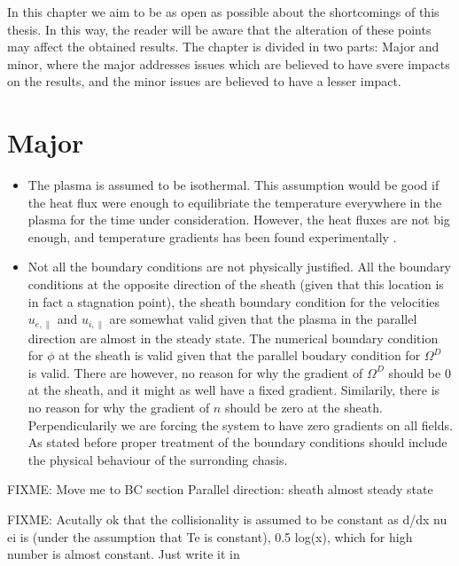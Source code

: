 In this chapter we aim to be as open as possible about the shortcomings of this
thesis. In this way, the reader will be aware that the alteration of these
points may affect the obtained results. The chapter is divided in two parts:
Major and minor, where the major addresses issues which are believed to have
svere impacts on the results, and the minor issues are believed to have a
lesser impact.

\section{Major}
\begin{itemize}[noitemsep,nolistsep]
    \item The plasma is assumed to be isothermal. This assumption would be good
        if the heat flux were enough to equilibriate the temperature
        everywhere in the plasma for the time under consideration.
        However, the heat fluxes are not big enough, and temperature gradients
        has been found experimentally \cite{Schroder2003}.
    \item Not all the boundary conditions are not physically justified. All the
        boundary conditions at the opposite direction of the sheath (given that
        this location is in fact a stagnation point), the sheath boundary
        condition for the velocities $u_{e,\|}$ and $u_{i,\|}$ are somewhat valid
        given that the plasma in the parallel direction are almost in the
        steady state. The numerical boundary condition for $\phi$ at the sheath is valid
        given that the parallel boudary condition for $\Omega^D$ is valid.
        There are however, no reason for why the gradient of $\Omega^D$ should
        be $0$ at the sheath, and it might as well have a fixed gradient.
        Similarily, there is no reason for why the gradient of $n$ should be
        zero at the sheath.
        Perpendicularily we are forcing the system to have zero gradients on
        all fields. As stated before proper treatment of the boundary
        conditions should include the physical behaviour of the surronding
        chasis.
\end{itemize}

FIXME: Move me to BC section
Parallel direction: sheath almost steady state

FIXME: Acutally ok that the collisionality is assumed to be constant as
d/dx nu ei is (under the assumption that Te is constant), 0.5 log(x), which for
high number is almost constant. Just write it in

